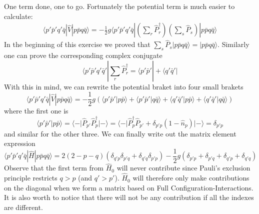 \documentclass[norsk,a4paper,12pt]{article}
\begin{document}
One term done, one to go. Fortunately the potential term is much easier to calculate:
\begin{align}
\langle p'\bar{p}'q'\bar{q}|\hat{V}|p\bar{p}q\bar{q}\rangle=-\frac{1}{2}g\langle p'\bar{p}'q'\bar{q}|(\sum_r\hat{P}_r^{\dagger})(\sum_s\hat{P}_s)|p\bar{p}q\bar{q}\rangle
\end{align}
In the beginning of this exercise we proved that $\sum_s\hat{P}_s|p\bar{p}q\bar{q}\rangle=|p\bar{p}q\bar{q}\rangle$. Similarly one can prove the corresponding complex conjugate
\begin{equation}
\langle p'\bar{p}'q'\bar{q}'|\sum_r\hat{P}_r^{\dagger}=\langle p'\bar{p}'|+\langle q'\bar{q}'|
\end{equation}
With this in mind, we can rewrite the potential braket into four small brakets
\begin{equation}
\langle p'\bar{p}'q'\bar{q}|\hat{V}|p\bar{p}q\bar{q}\rangle=-\frac{1}{2}g(\langle p'\bar{p}'|p\bar{p}\rangle+\langle p'\bar{p}'|q\bar{q}\rangle+\langle q'\bar{q}'|p\bar{p}\rangle+\langle q'\bar{q}'|q\bar{q}\rangle)
\end{equation}
where the first one is
\begin{equation}
\langle p'\bar{p}'|p\bar{p}\rangle=\langle -|\hat{P}_{p'}\hat{P}_p^{\dagger}|-\rangle=\langle -|\hat{P}_{p}^{\dagger}\hat{P}_{p'}+\delta_{p'p}(1-\hat{n}_p)|-\rangle=\delta_{p'p}
\end{equation}
and similar for the other three. We can finally write out the matrix element expression
\begin{equation}
\langle p'\bar{p}'q'\bar{q}|\hat{H}|p\bar{p}q\bar{q}\rangle=2(2-p-q)(\delta_{q'p}\delta_{p'q}+\delta_{q'q}\delta_{p'p})-\frac{1}{2}g(\delta_{p'p}+\delta_{p'q}+\delta_{q'p}+\delta_{q'q})
\end{equation}
Observe that the first term from $\hat{H}_0$ will never contribute since Pauli's exclusion principle restricts $q>p$ (and $q'>p'$). $\hat{H}_0$ will therefore only make contributions on the diagonal when we form a matrix based on Full Configuration-Interactions. It is also worth to notice that there will not be any contribution if all the indexes are different.
\end{document}
